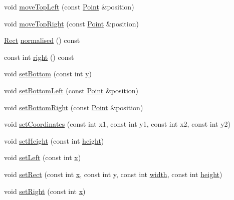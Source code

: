 \begin{DoxyCompactItemize}
\item 
void \hyperlink{classprism_1_1_rect_ae0ccad0d81dbda985be4e9ee8ae3f6f7}{move\+Top\+Left} (const \hyperlink{classprism_1_1_point}{Point} \&position)
\item 
void \hyperlink{classprism_1_1_rect_a24bdcf4de55d61b8c41010a8614203a7}{move\+Top\+Right} (const \hyperlink{classprism_1_1_point}{Point} \&position)
\item 
\hyperlink{classprism_1_1_rect}{Rect} \hyperlink{classprism_1_1_rect_ab08d9dbc02f86349530e0a2b6f6d05d6}{normalised} () const 
\item 
const int \hyperlink{classprism_1_1_rect_abf19c427e016b65d28118b8330de62d1}{right} () const 
\item 
void \hyperlink{classprism_1_1_rect_ac9d82a69be0dba946f8f9421aa33fffe}{set\+Bottom} (const int \hyperlink{classprism_1_1_rect_a6e951744e0bba0fed781b86ab0be680b}{y})
\item 
void \hyperlink{classprism_1_1_rect_a467b2b59e56d1aee949d9fb32681d559}{set\+Bottom\+Left} (const \hyperlink{classprism_1_1_point}{Point} \&position)
\item 
void \hyperlink{classprism_1_1_rect_a681ef54c0d6e0fac56394f15623c764f}{set\+Bottom\+Right} (const \hyperlink{classprism_1_1_point}{Point} \&position)
\item 
void \hyperlink{classprism_1_1_rect_ac930da7066defdd4646d801edc0b1cc0}{set\+Coordinates} (const int x1, const int y1, const int x2, const int y2)
\item 
void \hyperlink{classprism_1_1_rect_a0358cb30610f6bacde57613840bb5f4c}{set\+Height} (const int \hyperlink{classprism_1_1_rect_ad713f4536accdc6d5d2e6a6d83eac78b}{height})
\item 
void \hyperlink{classprism_1_1_rect_a58f42232724615d479b4cc3a08eeac01}{set\+Left} (const int \hyperlink{classprism_1_1_rect_a202fa9a56964c9111a968fb9b420f5f4}{x})
\item 
void \hyperlink{classprism_1_1_rect_a32978009107a8c2ea4787edde3960985}{set\+Rect} (const int \hyperlink{classprism_1_1_rect_a202fa9a56964c9111a968fb9b420f5f4}{x}, const int \hyperlink{classprism_1_1_rect_a6e951744e0bba0fed781b86ab0be680b}{y}, const int \hyperlink{classprism_1_1_rect_a8dae47a50fdac7a5f7e8aabef68437aa}{width}, const int \hyperlink{classprism_1_1_rect_ad713f4536accdc6d5d2e6a6d83eac78b}{height})
\item 
void \hyperlink{classprism_1_1_rect_a2e43d5a19fddd80fdbcee1c8892a775d}{set\+Right} (const int \hyperlink{classprism_1_1_rect_a202fa9a56964c9111a968fb9b420f5f4}{x})
\item 

\end{DoxyCompactItemize}

